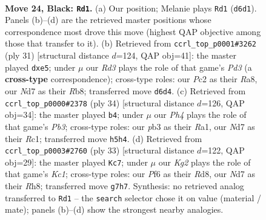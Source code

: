 \documentclass[11pt]{article}
\begin{document}
\clearpage

\begin{figure}[p]\centering
\begin{subfigure}{0.46\textwidth}\centering
\resizebox{\linewidth}{!}{%
\newchessgame
\chessboard[
  setfen={rnb5/1p1nb1k1/p2rppp1/7p/2N1B3/1P2P1P1/P1p1PK1P/R1B1R3 b - - 5 24},
  showmover=false,
  pgfstyle=straightmove, color=movearrow, markmove={d6-d1}
]}
\caption{}
\end{subfigure}\hfill
\begin{subfigure}{0.46\textwidth}\centering
\resizebox{\linewidth}{!}{%
\newchessgame
\chessboard[
  setfen={rr2b1k1/p3ppbp/2pp1np1/4P3/N7/1B5P/PPPBRPP1/R5K1 b - - 0 16},
  showmover=false,
  pgfstyle=straightmove, color=movearrow, markmove={d6-e5}
]}
\caption{}
\end{subfigure}
\\[4pt]
\begin{subfigure}{0.46\textwidth}\centering
\resizebox{\linewidth}{!}{%
\newchessgame
\chessboard[
  setfen={r6r/pp1nbkpp/2p1ppb1/1n6/3P4/1PB2NPB/1P1NPP1P/R1R3K1 w - - 2 18},
  showmover=false,
  pgfstyle=straightmove, color=movearrow, markmove={b3-b4}
]}
\caption{}
\end{subfigure}\hfill
\begin{subfigure}{0.46\textwidth}\centering
\resizebox{\linewidth}{!}{%
\newchessgame
\chessboard[
  setfen={2kr3r/1p1nppb1/p2p3p/4nPp1/4N3/1P4BP/1PP2PP1/2KR1B1R b - - 2 17},
  showmover=false,
  pgfstyle=straightmove, color=movearrow, markmove={c8-c7}
]}
\caption{}
\end{subfigure}
\caption{\textbf{Move 24, Black: \texttt{Rd1}.} (a) Our position; Melanie plays \texttt{Rd1} (\texttt{d6d1}). Panels (b)--(d) are the retrieved master positions whose correspondence most drove this move (highest QAP objective among those that transfer to it). (b) Retrieved from \texttt{ccrl\_top\_p0001\#3262} (ply 31) [structural distance $d$=124, QAP obj=41]: the master played \texttt{dxe5}; under $\mu$ our \emph{Rd3} plays the role of that game's \emph{Pd3} (a \textbf{cross-type} correspondence); cross-type roles: our \emph{P}c2 as their \emph{R}a8, our \emph{N}d7 as their \emph{R}b8; transferred move \texttt{d6d4}. (c) Retrieved from \texttt{ccrl\_top\_p0000\#2378} (ply 34) [structural distance $d$=126, QAP obj=34]: the master played \texttt{b4}; under $\mu$ our \emph{Ph4} plays the role of that game's \emph{Pb3}; cross-type roles: our \emph{p}b3 as their \emph{R}a1, our \emph{N}d7 as their \emph{R}c1; transferred move \texttt{h5h4}. (d) Retrieved from \texttt{ccrl\_top\_p0003\#2760} (ply 33) [structural distance $d$=122, QAP obj=29]: the master played \texttt{Kc7}; under $\mu$ our \emph{Kg2} plays the role of that game's \emph{Kc1}; cross-type roles: our \emph{P}f6 as their \emph{R}d8, our \emph{N}d7 as their \emph{R}h8; transferred move \texttt{g7h7}. Synthesis: no retrieved analog transferred to \texttt{Rd1} -- the \texttt{search} selector chose it on value (material / mate); panels (b)--(d) show the strongest nearby analogies.}
\label{fig:thought-m47}
\end{figure}
\end{document}
